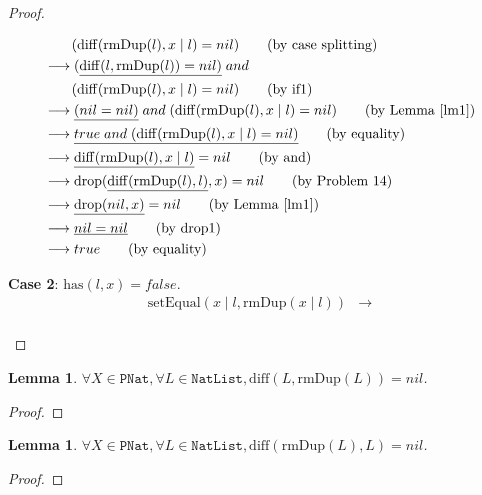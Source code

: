 \documentclass[12pt, a4paper]{article}
\newtheorem{lemma}[theorem]{Lemma}
\newcommand{\rel}[1]{\mathrel{#1}}
\newcommand{\rmx}[1]{\mathrm{#1}}
\newcommand{\larrow}{\longrightarrow}
\newcommand{\under}{\underline}
\begin{document}
\begin{proof}
\begin{description}
\begin{align*}
	&\quad \quad (\rmx{diff}(\rmx{rmDup}(l), x \mid l) = nil) \tag{by case splitting} \\
	&\larrow (\under{\rmx{diff}(l, \rmx{rmDup}(l)) = nil)} \rel{and} \\
	&\quad \quad (\rmx{diff}(\rmx{rmDup}(l), x \mid l) = nil) \tag{by if1} \\
	&\larrow \under{(nil = nil)} \rel{and} (\rmx{diff}(\rmx{rmDup}(l), x \mid l) = nil) \tag{by Lemma~\ref{lm1}} \\
	&\larrow \under{true \rel{and} (\rmx{diff}(\rmx{rmDup}(l), x \mid l) = nil)} \tag{by equality} \\
	&\larrow \under{\rmx{diff}(\rmx{rmDup}(l), x \mid l)} = nil \tag{by and} \\
	&\larrow \rmx{drop}(\under{\rmx{diff}(\rmx{rmDup}(l), l)}, x) = nil \tag{by Problem 14} \\
	&\larrow \under{\rmx{drop}(nil, x)} = nil \tag{by Lemma~\ref{lm1}} \\
	&\larrow \under{nil = nil} \tag{by drop1} \\
	&\larrow true \tag{by equality} \\
\end{align*}

\textbf{Case 2}: $\rmx{has}(l, x) = false$.
\begin{align*}
\rmx{setEqual}(x \mid l, \rmx{rmDup}(x \mid l))
	&\larrow  \tag{by IH} \\
\end{align*}
\end{description}
\end{proof}

\begin{lemma}
\label{lm1}
$\forall X \in \mathtt{PNat}, \forall L \in \mathtt{NatList}, \rmx{diff}(L, \rmx{rmDup}(L)) = nil$.
\end{lemma}
\begin{proof}
\end{proof}

\begin{lemma}
\label{lm2}
$\forall X \in \mathtt{PNat}, \forall L \in \mathtt{NatList}, \rmx{diff}(\rmx{rmDup}(L), L) = nil$.
\end{lemma}
\begin{proof}
\end{proof}
\end{document}
